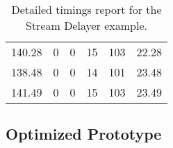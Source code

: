 \begin{table}[h]
{\begin{tabular}{cccccc}
            140.28             & 0                          & 0                          & 15                         & 103                        & 22.28                  \\
            138.48             & 0                          & 0                          & 14                         & 101                        & 23.48                  \\
            141.49             & 0                          & 0                          & 15                         & 103                        & 23.49                  \\
            \bottomrule
        \end{tabular}
    }
    \caption{Detailed timings report for the Stream Delayer example.}
\end{table}

\clearpage
\subsection{Optimized Prototype}

